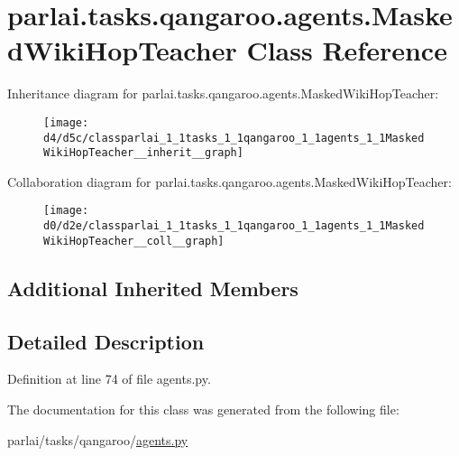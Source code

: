 \hypertarget{classparlai_1_1tasks_1_1qangaroo_1_1agents_1_1MaskedWikiHopTeacher}{}\section{parlai.\+tasks.\+qangaroo.\+agents.\+Masked\+Wiki\+Hop\+Teacher Class Reference}
\label{classparlai_1_1tasks_1_1qangaroo_1_1agents_1_1MaskedWikiHopTeacher}


Inheritance diagram for parlai.\+tasks.\+qangaroo.\+agents.\+Masked\+Wiki\+Hop\+Teacher\+:
\nopagebreak
\begin{figure}[H]
\begin{center}
\leavevmode
\texttt{[image: d4/d5c/classparlai\_1\_1tasks\_1\_1qangaroo\_1\_1agents\_1\_1MaskedWikiHopTeacher\_\_inherit\_\_graph]}
\end{center}
\end{figure}


Collaboration diagram for parlai.\+tasks.\+qangaroo.\+agents.\+Masked\+Wiki\+Hop\+Teacher\+:
\nopagebreak
\begin{figure}[H]
\begin{center}
\leavevmode
\texttt{[image: d0/d2e/classparlai\_1\_1tasks\_1\_1qangaroo\_1\_1agents\_1\_1MaskedWikiHopTeacher\_\_coll\_\_graph]}
\end{center}
\end{figure}
\subsection*{Additional Inherited Members}


\subsection{Detailed Description}


Definition at line 74 of file agents.\+py.



The documentation for this class was generated from the following file\+:\begin{DoxyCompactItemize}
\item 
parlai/tasks/qangaroo/\hyperlink{parlai_2tasks_2qangaroo_2agents_8py}{agents.\+py}\end{DoxyCompactItemize}
